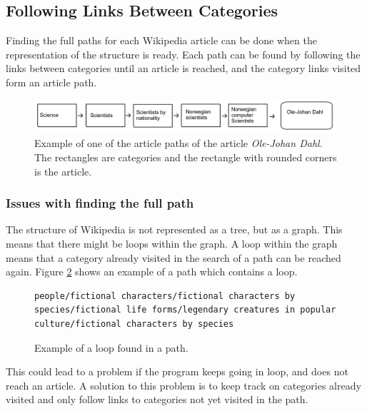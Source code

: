 \subsection{Following Links Between Categories}
\label{sec:following_links_between_categories}
Finding the full paths for each Wikipedia article can be done when the representation of the structure is ready. Each path can be found by following the links between categories until an article is reached, and the category links visited form an article path. 

\begin{figure}[h]
\centering
\includegraphics[width=\textwidth]{Chapters/Implementation/example_path}
\caption[Example of an article path]{Example of one of the article paths of the article \emph{Ole-Johan Dahl}. The rectangles are categories and the rectangle with rounded corners is the article. }
\label{fig:examplepath}
\end{figure}

\subsubsection{Issues with finding the full path}
The structure of Wikipedia is not represented as a tree, but as a graph. This means that there might be loops within the graph. A loop within the graph means that a category already visited in the search of a path can be reached again. Figure \ref{fig:exampleloop} shows an example  of a path which contains a loop.

\begin{figure}[h]
\centering
\begin{lstlisting}
people/fictional characters/fictional characters by species/fictional life forms/legendary creatures in popular culture/fictional characters by species
\end{lstlisting}
\caption{Example of a loop found in a path.}
\label{fig:exampleloop}
\end{figure}


This could lead to a problem if the program keeps going in loop, and does not reach an article. A solution to this problem is to keep track on categories already visited and only follow links to categories not yet visited in the path. 

